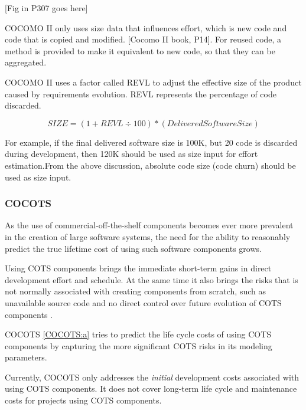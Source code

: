 [Fig in P307 goes here]



COCOMO II only uses size data that influences effort, which is new
code and code that is copied and modified. [Cocomo II book, P14].
For reused code, a method is provided to make it equivalent to new
code, so that they can be aggregated.

COCOMO II uses a factor called REVL to adjust the effective size
of the product caused by requirements evolution. REVL represents
the percentage of code discarded.

  \begin{equation}\label{size equation}
    SIZE = (1 + REVL \div 100) * (Delivered Software Size)
  \end{equation}

For example, if the final delivered software size is 100K, but 20%
code is discarded during development, then 120K should be used as
size input for effort estimation.From the above discussion,
absolute code size (code churn) should be used as size input.






\subsubsection{COCOTS}

As the use of commercial-off-the-shelf components becomes ever
more prevalent in the creation of large software systems, the need
for the ability to reasonably predict the true lifetime cost of
using such software components grows.


Using COTS components brings the immediate short-term gains in
direct development effort and schedule. At the same time it also
brings the risks that is not normally associated with creating
components from scratch, such as unavailable source code and no
direct control over future evolution of COTS components .

COCOTS \ref{COCOTS:a} tries to predict the life cycle costs of
using COTS components by capturing the more significant COTS risks
in its modeling parameters.

Currently, COCOTS only addresses the \textit{initial} development
costs associated with using COTS components. It does not cover
long-term life cycle and maintenance costs for projects using COTS
components.

